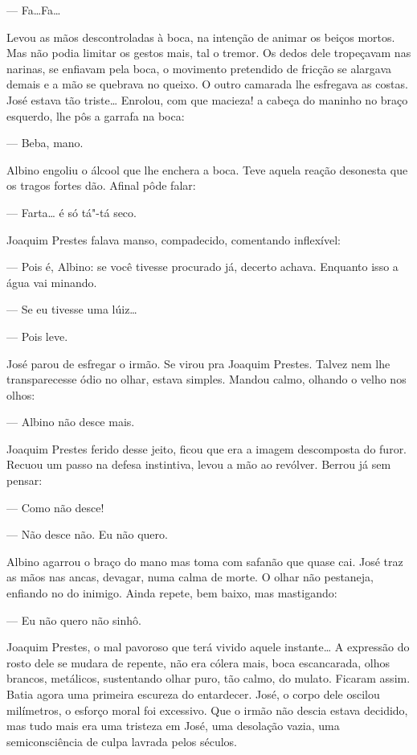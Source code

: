 --- Fa\ldots{}Fa\ldots{}

Levou as mãos descontroladas à boca, na intenção de animar os beiços
mortos. Mas não podia limitar os gestos mais, tal o tremor. Os dedos
dele tropeçavam nas narinas, se enfiavam pela boca, o movimento
pretendido de fricção se alargava demais e a mão se quebrava no queixo.
O outro camarada lhe esfregava as costas. José estava tão triste\ldots{}
Enrolou, com que macieza! a cabeça do maninho no braço esquerdo, lhe pôs
a garrafa na boca:

--- Beba, mano.

Albino engoliu o álcool que lhe enchera a boca. Teve aquela reação
desonesta que os tragos fortes dão. Afinal pôde falar:

--- Farta\ldots{} é só tá"-tá seco.

Joaquim Prestes falava manso, compadecido, comentando inflexível:

--- Pois é, Albino: se você tivesse procurado já, decerto achava.
Enquanto isso a água vai minando.

--- Se eu tivesse uma lúiz\ldots{}

--- Pois leve.

José parou de esfregar o irmão. Se virou pra Joaquim Prestes. Talvez nem
lhe transparecesse ódio no olhar, estava simples. Mandou calmo, olhando
o velho nos olhos:

--- Albino não desce mais.

Joaquim Prestes ferido desse jeito, ficou que era a imagem descomposta
do furor. Recuou um passo na defesa instintiva, levou a mão ao revólver.
Berrou já sem pensar:

--- Como não desce!

--- Não desce não. Eu não quero.

Albino agarrou o braço do mano mas toma com safanão que quase cai. José
traz as mãos nas ancas, devagar, numa calma de morte. O olhar não
pestaneja, enfiando no do inimigo. Ainda repete, bem baixo, mas
mastigando:

--- Eu não quero não sinhô.

Joaquim Prestes, o mal pavoroso que terá vivido aquele instante\ldots{} A
expressão do rosto dele se mudara de repente, não era cólera mais, boca
escancarada, olhos brancos, metálicos, sustentando olhar puro, tão
calmo, do mulato. Ficaram assim. Batia agora uma primeira escureza do
entardecer. José, o corpo dele oscilou milímetros, o esforço moral foi
excessivo. Que o irmão não descia estava decidido, mas tudo mais era uma
tristeza em José, uma desolação vazia, uma semiconsciência de culpa
lavrada pelos séculos.

